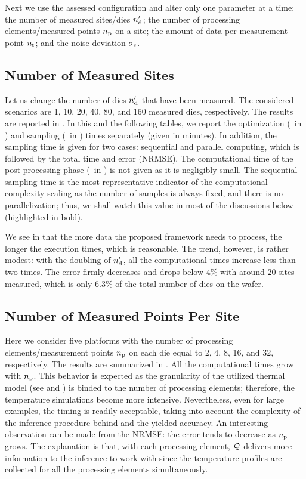 Next we use the assessed configuration and alter only one parameter at a time: the number of measured sites/dies ${n_\text{d}'}$; the number of processing elements/measured points ${n_\text{p}}$ on a site; the amount of data per measurement point ${n_\text{t}}$; and the noise deviation $\sigma_\epsilon$.

\subsection{Number of Measured Sites}
Let us change the number of dies ${n_\text{d}'}$ that have been measured.
The considered scenarios are 1, 10, 20, 40, 80, and 160 measured dies, respectively.
The results are reported in .
In this and the following tables, we report the optimization (\ in ) and sampling (\ in ) times separately (given in minutes).
In addition, the sampling time is given for two cases: sequential and parallel computing, which is followed by the total time and error (NRMSE).
The computational time of the post-processing phase (\ in ) is not given as it is negligibly small.
The sequential sampling time is the most representative indicator of the computational complexity scaling as the number of samples is always fixed, and there is no parallelization; thus, we shall watch this value in most of the discussions below (highlighted in bold).

We see in  that the more data the proposed framework needs to process, the longer the execution times, which is reasonable.
The trend, however, is rather modest: with the doubling of ${n_\text{d}'}$, all the computational times increase less than two times.
The error firmly decreases and drops below 4\% with around 20 sites measured, which is only 6.3\% of the total number of dies on the wafer.

\subsection{Number of Measured Points Per Site}
Here we consider five platforms with the number of processing elements/measurement points ${n_\text{p}}$ on each die equal to 2, 4, 8, 16, and 32, respectively.
The results are summarized in .
All the computational times grow with ${n_\text{p}}$.
This behavior is expected as the granularity of the utilized thermal model (see  and \cite{ukhov2012}) is binded to the number of processing elements; therefore, the temperature simulations become more intensive.
Nevertheless, even for large examples, the timing is readily acceptable, taking into account the complexity of the inference procedure behind and the yielded accuracy.
An interesting observation can be made from the NRMSE: the error tends to decrease as ${n_\text{p}}$ grows.
The explanation is that, with each processing element, $\mathcal{Q}$ delivers more information to the inference to work with since the temperature profiles are collected for all the processing elements simultaneously.

